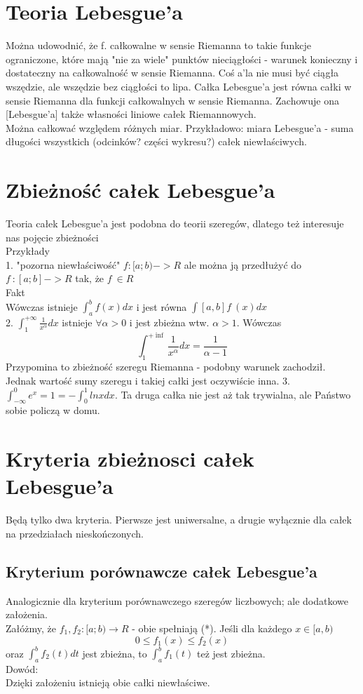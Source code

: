 \documentclass[12pt,a4paper,article]{memoir} %
\begin{document}
\section{Teoria Lebesgue'a}
Można udowodnić, że f. całkowalne w sensie Riemanna to takie funkcje ograniczone, które mają "nie za wiele" punktów nieciągłości - warunek konieczny i dostateczny na całkowalność w sensie Riemanna. Coś a'la nie musi być ciągła wszędzie, ale wszędzie bez ciągłości to lipa.
Całka Lebesgue'a jest równa całki w sensie Riemanna dla funkcji całkowalnych w sensie Riemanna. Zachowuje ona [Lebesgue'a] także własności liniowe całek Riemannowych. \\
Można całkować względem różnych miar. Przykładowo: miara Lebesgue'a - suma długości wszystkich (odcinków? części wykresu?) całek niewłaściwych.
\section{Zbieżność całek Lebesgue'a}
Teoria całek Lebesgue'a jest podobna do teorii szeregów, dlatego też interesuje nas pojęcie zbieżności \\
Przykłady \\
1. "pozorna niewłaściwość"
$f : [a;b) -> R$ ale można ją przedłużyć do \\
$f^{~} : [a;b] -> R $ tak, że $ f^{~} \in R$ \\
Fakt \\
Wówczas istnieje $\int_{a}^{b} f(x) dx$ i jest równa $\int[a,b] f^{~}(x)dx $ \\
2. $ \int_{1}^{+\infty} \frac{1}{x^\alpha} dx $ istnieje $ \forall \alpha > 0 $ i jest zbieżna wtw. $ \alpha > 1 $. Wówczas \[ \int_{1}^{+\inf} \frac{1}{x^\alpha} dx = \frac{1}{\alpha - 1} \]
Przypomina to zbieżność szeregu Riemanna - podobny warunek zachodził. Jednak wartość sumy szeregu i takiej całki jest oczywiście inna.
3. $ \int_{-\infty}^{0} e^x = 1 = -\int_{0}^{1} lnx dx $. Ta druga całka nie jest aż tak trywialna, ale Państwo sobie policzą w domu.
\section{Kryteria zbieżnosci całek Lebesgue'a}
Będą tylko dwa kryteria. Pierwsze jest uniwersalne, a drugie wyłącznie dla całek na przedziałach nieskończonych.
\subsection{Kryterium porównawcze całek Lebesgue'a}
Analogicznie dla kryterium porównawczego szeregów liczbowych; ale dodatkowe założenia. \\
Załóżmy, że $f_1, f_2 : [a;b) \to R $ - obie spełniają (*).
Jeśli dla każdego $ x \in [a,b) $
\[ 0 \leq f_1(x) \leq f_2(x) \]
oraz $ \int_a^b f_2 (t)dt $ jest zbieżna, to $\int_a^b f_1 (t)$ też jest zbieżna. \\
Dowód: \\
Dzięki założeniu istnieją obie całki niewłaściwe.
\end{document}
